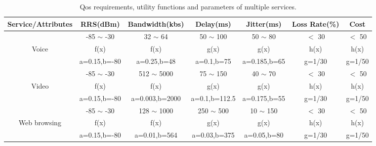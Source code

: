 \documentclass[conference]{IEEEtran}
\begin{document}
\begin{table*}[t]
	\caption{Qos requirements, utility functions and parameters of multiple services.}
	\begin{center}
		\begin{tabular}{c c c c c c c}
			\hline
			\textbf{Service/Attributes}&\textbf{RRS(dBm)}&\textbf{Bandwidth(kbs)}&\textbf{Delay(ms)}&\textbf{Jitter(ms)}&\textbf{Loss Rate(\%)}&\textbf{Cost} \\
			\hline
			&-85 $ \sim $ -30 &32 $ \sim $ 64&50 $ \sim $ 100& 50 $ \sim $ 80&$ < $ 30&$ < $ 50   \\
			Voice&f(x)&f(x)&g(x)&g(x)&h(x)&h(x)          \\
			&a=0.15,b=-80&a=0.25,b=48&a=0.1,b=75&a=0.185,b=65&g=1/30&g=1/50  \\
			\hline
			&-85 $ \sim $ -30 &512 $ \sim $ 5000 &75 $ \sim $ 150&40 $ \sim $ 70&$ < $ 30&$ < $ 50            \\
			Video&f(x)&f(x)&g(x)&g(x)&h(x)&h(x)          \\
			&a=0.15,b=-80&a=0.003,b=2000&a=0.1,b=112.5&a=0.175,b=55&g=1/30&g=1/50 \\
			\hline
			&-85 $ \sim $ -30 &128 $ \sim $ 1000&250 $ \sim $ 500&10 $ \sim $ 150&$ < $ 30&$ < $ 50        \\
			Web browsing&f(x)&f(x)&g(x)&g(x)&h(x)&h(x)          \\
			&a=0.15,b=-80&a=0.01,b=564&a=0.03,b=375&a=0.05,b=80&g=1/30&g=1/50    \\
			\hline
		\end{tabular}
		\label{ufunc}
	\end{center}
\end{table*}
\end{document}
